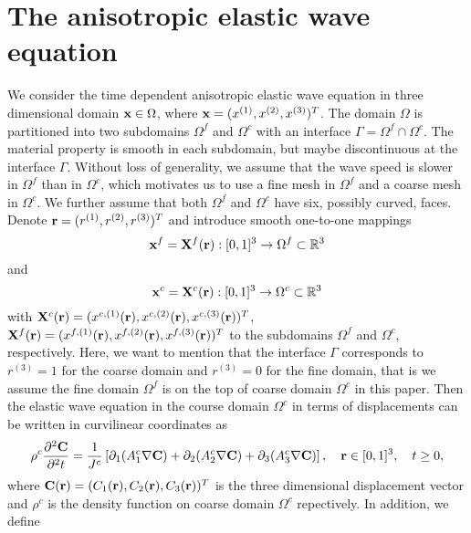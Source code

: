 \section{The anisotropic elastic wave equation }
We consider the time dependent anisotropic elastic wave equation in three dimensional domain ${\bf x}\in\Omega$, where ${\bf x} = (x^{(1)},x^{(2)},x^{(3)})^T$. 
The domain $\Omega$ is partitioned into two subdomains $\Omega^f$ and $\Omega^c$ with an interface $\Gamma = \Omega^f\cap\Omega^c$. The material property is smooth in each subdomain, but maybe discontinuous at the interface $\Gamma$. Without loss of generality, we assume that the wave speed is slower in $\Omega^f$ than in $\Omega^c$, which motivates us to use a fine mesh in $\Omega^f$ and a coarse mesh in $\Omega^c$.  We further assume that both $\Omega^f$ and $\Omega^c$ have six, possibly curved, faces. Denote ${\bf r} = (r^{(1)},r^{(2)},r^{(3)})^T$ and  introduce smooth one-to-one mappings 
\[{\bf x}^{f} = {\bf X}^{f}({\bf r}) :  [0,1]^3 \rightarrow \Omega^{f} \subset \mathbb{R}^3 \]
and 
\[{\bf x}^{c} = {\bf X}^{c}({\bf r}) :  [0,1]^3 \rightarrow \Omega^{c} \subset \mathbb{R}^3\]
with ${\bf X}^{c}({\bf r}) = (x^{c,(1)}({\bf r}),x^{c,(2)}({\bf r}),x^{c,(3)}({\bf r}))^T$, ${\bf X}^{f}({\bf r}) = (x^{f,(1)}({\bf r}),x^{f,(2)}({\bf r}),x^{f,(3)}({\bf r}))^T$ to the subdomains $\Omega^f$ and $\Omega^c$,  respectively. Here, we want to mention that the interface $\Gamma$ corresponds to $r^{(3)} = 1$ for the coarse domain and $r^{(3)} = 0$ for the fine domain, that is we assume the fine domain $\Omega^f$ is on the top of coarse domain $\Omega^c$ in this paper. Then the elastic wave equation in the course domain $\Omega^c$ in terms of displacements can be written in curvilinear coordinates as
\begin{align}\label{elastic_curvi}
	\rho^c\frac{\partial^2{\bf C}}{\partial^2 t} = \frac{1}{J^c}\left[\partial_1(A_1^c\nabla{\bf C}) + \partial_2(A_2^c\nabla{\bf C}) +\partial_3(A_3^c\nabla{\bf C}) \right],\ \ \  {\bf r}\in[0,1]^3,\ \ \  t\geq0,
\end{align}
where ${\bf C}({\bf r}) = (C_1({\bf r}),C_2({\bf r}),C_3({\bf r}))^T$ is the three dimensional displacement vector and $\rho^c$ is the density function on coarse domain $\Omega^c$ repectively. In addition, we define
